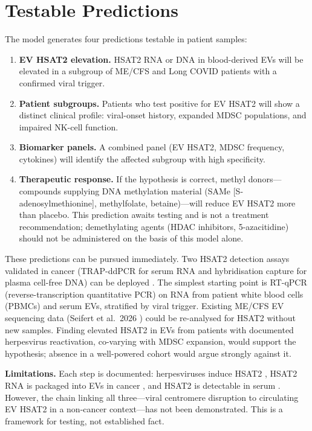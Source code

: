 \documentclass[11pt,a4paper]{scrartcl}
\begin{document}
\section{Testable Predictions}

The model generates four predictions testable in patient samples:

\begin{enumerate}[label=(\arabic*)]
  \item \textbf{EV HSAT2 elevation.}  HSAT2 RNA or DNA in
    blood-derived EVs will be elevated in a subgroup of ME/CFS
    and Long COVID patients with a confirmed viral trigger.
  \item \textbf{Patient subgroups.}  Patients who test positive for
    EV HSAT2 will show a distinct clinical profile: viral-onset
    history, expanded MDSC populations, and impaired NK-cell
    function.
  \item \textbf{Biomarker panels.}  A combined panel (EV HSAT2,
    MDSC frequency, cytokines) will identify the affected subgroup
    with high specificity.
  \item \textbf{Therapeutic response.}  If the hypothesis is
    correct, methyl donors---compounds supplying DNA methylation
    material (SAMe [S-adenosylmethionine], methylfolate,
    betaine)---will reduce EV HSAT2 more than placebo.  This
    prediction awaits testing and is not a treatment recommendation;
    demethylating agents (HDAC inhibitors, 5-azacitidine) should not
    be administered on the basis of this model alone.
\end{enumerate}

These predictions can be pursued immediately.  Two HSAT2 detection
assays validated in cancer (TRAP-ddPCR for serum RNA and
hybridisation capture for plasma cell-free DNA) can be deployed
\cite{Seimiya2023HSATII,Yoruker2026HSAT2cfDNA}.  The simplest
starting point is RT-qPCR (reverse-transcription quantitative
PCR) on RNA from patient white blood cells (PBMCs) and
serum EVs, stratified by viral trigger.  Existing ME/CFS EV
sequencing data (Seifert et al.\ 2026 \cite{Seifert2026EVmiRNA})
could be re-analysed for HSAT2 without new samples.  Finding elevated HSAT2 in EVs from patients with
documented herpesvirus reactivation, co-varying with MDSC
expansion, would support the hypothesis; absence in a well-powered
cohort would argue strongly against it.

\textbf{Limitations.}  Each step is documented: herpesviruses
induce HSAT2 \cite{Nogalski2019HSATII}, HSAT2 RNA is packaged into
EVs in cancer \cite{Ruzanov2024ETSsatelliteEV}, and HSAT2 is
detectable in serum \cite{Kishikawa2016SATII,Seimiya2023HSATII}.
However, the chain linking all three---viral centromere disruption
to circulating EV HSAT2 in a non-cancer context---has not been
demonstrated.  This is a framework for testing, not established
fact.
\end{document}
